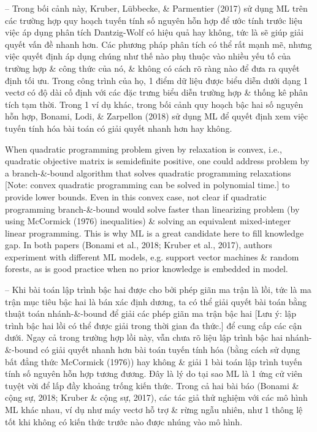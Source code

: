 \documentclass{article}
\begin{document}
\begin{itemize}
\begin{itemize}
\begin{itemize}
            -- Trong bối cảnh này, Kruber, Lübbecke, \& Parmentier (2017) sử dụng ML trên các trường hợp quy hoạch tuyến tính số nguyên hỗn hợp để ước tính trước liệu việc áp dụng phân tích Dantzig-Wolf có hiệu quả hay không, tức là sẽ giúp giải quyết vấn đề nhanh hơn. Các phương pháp phân tích có thể rất mạnh mẽ, nhưng việc quyết định áp dụng chúng như thế nào phụ thuộc vào nhiều yếu tố của trường hợp \& công thức của nó, \& không có cách rõ ràng nào để đưa ra quyết định tối ưu. Trong công trình của họ, 1 điểm dữ liệu được biểu diễn dưới dạng 1 vectơ có độ dài cố định với các đặc trưng biểu diễn trường hợp \& thống kê phân tích tạm thời. Trong 1 ví dụ khác, trong bối cảnh quy hoạch bậc hai số nguyên hỗn hợp, Bonami, Lodi, \& Zarpellon (2018) sử dụng ML để quyết định xem việc tuyến tính hóa bài toán có giải quyết nhanh hơn hay không.

            When quadratic programming problem given by relaxation is convex, i.e., quadratic objective matrix is semidefinite positive, one could address problem by a branch-\&-bound algorithm that solves quadratic programming relaxations [Note: convex quadratic programming can be solved in polynomial time.] to provide lower bounds. Even in this convex case, not clear if quadratic programming branch-\&-bound would solve faster than linearizing problem (by using McCormick (1976) inequalities) \& solving an equivalent mixed-integer linear programming. This is why ML is a great candidate here to fill knowledge gap. In both papers (Bonami et al., 2018; Kruber et al., 2017), authors experiment with different ML models, e.g. support vector machines \& random forests, as is good practice when no prior knowledge is embedded in model.

            -- Khi bài toán lập trình bậc hai được cho bởi phép giãn ma trận là lồi, tức là ma trận mục tiêu bậc hai là bán xác định dương, ta có thể giải quyết bài toán bằng thuật toán nhánh-\&-bound để giải các phép giãn ma trận bậc hai [Lưu ý: lập trình bậc hai lồi có thể được giải trong thời gian đa thức.] để cung cấp các cận dưới. Ngay cả trong trường hợp lồi này, vẫn chưa rõ liệu lập trình bậc hai nhánh-\&-bound có giải quyết nhanh hơn bài toán tuyến tính hóa (bằng cách sử dụng bất đẳng thức McCormick (1976)) hay không \& giải 1 bài toán lập trình tuyến tính số nguyên hỗn hợp tương đương. Đây là lý do tại sao ML là 1 ứng cử viên tuyệt vời để lấp đầy khoảng trống kiến thức. Trong cả hai bài báo (Bonami \& cộng sự, 2018; Kruber \& cộng sự, 2017), các tác giả thử nghiệm với các mô hình ML khác nhau, ví dụ như máy vectơ hỗ trợ \& rừng ngẫu nhiên, như 1 thông lệ tốt khi không có kiến thức trước nào được nhúng vào mô hình.


\end{itemize}
\end{itemize}
\end{itemize}
\end{document}
